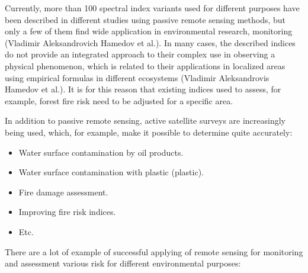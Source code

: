 	Currently, more than 100 spectral index variants used for different purposes have been described in different studies using passive remote sensing methods, but only a few of them find wide application in environmental research, monitoring (Vladimir Aleksandrovich Hamedov et al.). In many cases, the described indices do not provide an integrated approach to their complex use in observing a physical phenomenon, which is related to their applications in localized areas using empirical formulas in different ecosystems (Vladimir Aleksandrovis Hamedov et al.). It is for this reason that existing indices used to assess, for example, forest fire risk need to be adjusted for a specific area.
	
	In addition to passive remote sensing, active satellite surveys are increasingly being used, which, for example, make it possible to determine quite accurately:

\begin{itemize}
	\item Water surface contamination by oil products.
	\item Water surface contamination with plastic (plastic).
	\item Fire damage assessment.
	\item Improving fire risk indices.
	\item Etc.
\end{itemize}

	There are a lot of example of successful applying of remote sensing for monitoring and assessment various risk for different environmental purposes:

